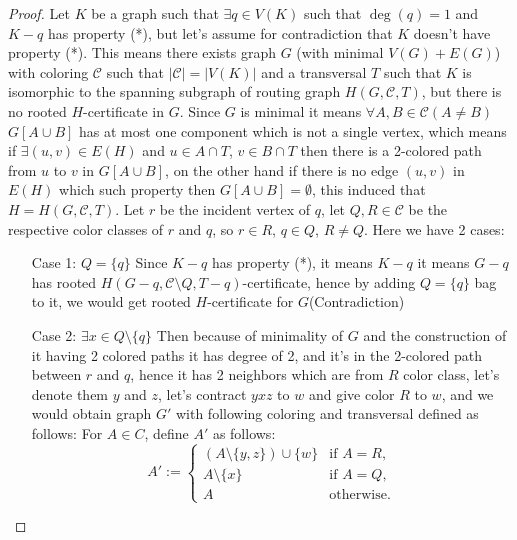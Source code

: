 \begin{proof}
    Let $K$ be a graph such that $\exists q \in V(K)$ such that $\deg(q) = 1$ and $K - q$ has property (*), but let's assume for contradiction that $K$ doesn't have property (*).
    This means there exists graph $G$ (with minimal $V(G) + E(G)$) with coloring $\mathcal{C}$ such that $|\mathcal{C}| = |V(K)|$
    and a transversal $T$ such that $K$ is isomorphic to the spanning subgraph of routing graph $H(G, \mathcal{C}, T)$, but there is no rooted $H$-certificate in $G$.
    Since $G$ is minimal it means $\forall A,B \in \mathcal{C} (A \neq B)$ $G[A \cup B]$ has at most one component which is not a single vertex,
    which means if $\exists (u,v) \in E(H)$ and $u \in A \cap T$, $v \in B \cap T$ then there is a 2-colored path from $u$ to $v$ in $G[A \cup B]$,
    on the other hand if there is no edge $(u,v)$ in $E(H)$ which such property then $G[A \cup B] = \emptyset$,
    this induced that $H = H(G, \mathcal{C}, T)$. Let $r$ be the incident vertex of $q$, let $Q, R \in \mathcal{C}$ be the respective color classes of $r$ and $q$,
    so $r \in R$, $q \in Q$, $R \neq Q$.
    \newline Here we have 2 cases:
    \begin{itemize}
        \item[Case 1:] $Q = \{q\}$ \newline
        Since $K - q$ has property (*), it means $K - q$ it means $G - q$ has rooted $H(G - q, \mathcal{C} \setminus {Q}, T - q)$-certificate,
        hence by adding $Q = \{q\}$ bag to it, we would get rooted $H$-certificate for $G$(Contradiction)
        \item[Case 2:] $\exists x \in Q\setminus\{q\}$ \newline
        Then because of minimality of $G$ and the construction of it having 2 colored paths it has degree of 2, and it's in the 2-colored path between $r$ and $q$,
        hence it has 2 neighbors which are from $R$ color class, let's denote them $y$ and $z$, let's contract $yxz$ to $w$ and give color $R$ to $w$, and we would obtain graph $G'$
        with following coloring and transversal defined as follows: \newline
        For \( A \in C \), define \( A' \) as follows:
        \[
        A' :=
        \begin{cases}
        (A \setminus \{y, z\}) \cup \{w\} & \text{if } A = R, \\
        A \setminus \{x\} & \text{if } A = Q, \\
        A & \text{otherwise}.
        \end{cases}
        \]
        

\end{itemize}
\end{proof}
